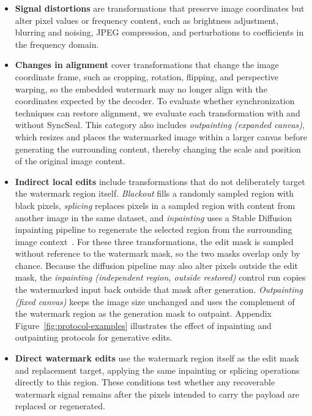 \documentclass[sigconf,nonacm]{acmart}
\begin{document}
\begin{itemize}[leftmargin=*]
\item  \textbf{Signal distortions} are transformations that preserve image coordinates but alter pixel values or frequency content, such as brightness adjustment, blurring and noising, JPEG compression, and perturbations to coefficients in the frequency domain.
\item  \textbf{Changes in alignment} cover transformations that change the image coordinate frame, such as cropping, rotation, flipping, and perspective warping, so the embedded watermark may no longer align with the coordinates expected by the decoder. To evaluate whether synchronization techniques can restore alignment, we evaluate each transformation with and without SyncSeal. This category also includes \emph{outpainting (expanded canvas)}, which resizes and places the watermarked image within a larger canvas before generating the surrounding content, thereby changing the scale and position of the original image content.
\item \textbf{Indirect local edits} include transformations that do not deliberately target the watermark region itself. \emph{Blackout} fills a randomly sampled region with black pixels, \emph{splicing} replaces pixels in a sampled region with content from another image in the same dataset, and \emph{inpainting} uses a Stable Diffusion inpainting pipeline to regenerate the selected region from the surrounding image context~\cite{rombach2022highresolution}. For these three transformations, the edit mask is sampled without reference to the watermark mask, so the two masks overlap only by chance. Because the diffusion pipeline may also alter pixels outside the edit mask, the \emph{inpainting (independent region, outside restored)} control run copies the watermarked input back outside that mask after generation. \emph{Outpainting (fixed canvas)} keeps the image size unchanged and uses the complement of the watermark region as the generation mask to outpaint.  Appendix Figure~\ref{fig:protocol-examples} illustrates the effect of inpainting and outpainting protocols for generative edits.

\item \textbf{Direct watermark edits} use the watermark region itself as the edit mask and replacement target, applying the same inpainting or splicing operations directly to this region. These conditions test whether any recoverable watermark signal remains after the pixels intended to carry the payload are replaced or regenerated.
\end{itemize}
\end{document}
